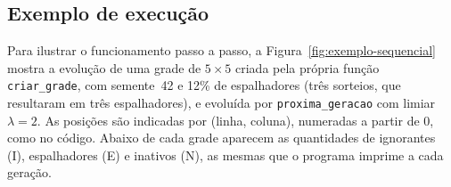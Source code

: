 \subsection{Exemplo de execução}\label{sub:exemplo-sequencial}

Para ilustrar o funcionamento passo a passo, a Figura~\ref{fig:exemplo-sequencial} mostra a evolução de uma grade de $5 \times 5$ criada pela própria função \texttt{criar\_grade}, com semente~42 e 12\% de espalhadores (três sorteios, que resultaram em três espalhadores), e evoluída por \texttt{proxima\_geracao} com limiar $\lambda = 2$. As posições são indicadas por (linha, coluna), numeradas a partir de 0, como no código. Abaixo de cada grade aparecem as quantidades de ignorantes (I), espalhadores (E) e inativos (N), as mesmas que o programa imprime a cada geração.

